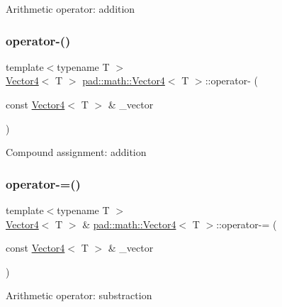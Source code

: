 Arithmetic operator\+: addition \mbox{\label{structpad_1_1math_1_1_vector4_a05cc7e4f760aae9610025584d1608b50}} 
\subsubsection{\texorpdfstring{operator-\/()}{operator-()}}
{\footnotesize\ttfamily template$<$typename T $>$ \\
\mbox{\hyperlink{structpad_1_1math_1_1_vector4}{Vector4}}$<$ T $>$ \mbox{\hyperlink{structpad_1_1math_1_1_vector4}{pad\+::math\+::\+Vector4}}$<$ T $>$\+::operator-\/ (\begin{DoxyParamCaption}\item[{const \mbox{\hyperlink{structpad_1_1math_1_1_vector4}{Vector4}}$<$ T $>$ \&}]{\+\_\+vector }\end{DoxyParamCaption})}

Compound assignment\+: addition \mbox{\label{structpad_1_1math_1_1_vector4_ae27aa6827d54b1b0033ee99e79d19660}} 
\subsubsection{\texorpdfstring{operator-\/=()}{operator-=()}}
{\footnotesize\ttfamily template$<$typename T $>$ \\
\mbox{\hyperlink{structpad_1_1math_1_1_vector4}{Vector4}}$<$ T $>$ \& \mbox{\hyperlink{structpad_1_1math_1_1_vector4}{pad\+::math\+::\+Vector4}}$<$ T $>$\+::operator-\/= (\begin{DoxyParamCaption}\item[{const \mbox{\hyperlink{structpad_1_1math_1_1_vector4}{Vector4}}$<$ T $>$ \&}]{\+\_\+vector }\end{DoxyParamCaption})}

Arithmetic operator\+: substraction \mbox{\label{structpad_1_1math_1_1_vector4_ad818def83cbc4255b79ec185450633ca}} 
